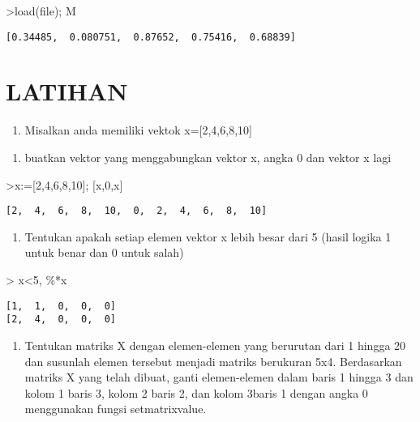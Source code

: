 \documentclass[
]{book}
\providecommand{\tightlist}{%
  \setlength{\itemsep}{0pt}\setlength{\parskip}{0pt}}
\begin{document}
\textgreater load(file); M

\begin{verbatim}
[0.34485,  0.080751,  0.87652,  0.75416,  0.68839]
\end{verbatim}

\section{LATIHAN}\label{latihan}

\begin{enumerate}
\def\labelenumi{\arabic{enumi}.}
\tightlist
\item
  Misalkan anda memiliki vektok x={[}2,4,6,8,10{]}
\end{enumerate}

\begin{enumerate}
\def\labelenumi{\alph{enumi}.}
\tightlist
\item
  buatkan vektor yang menggabungkan vektor x, angka 0 dan vektor x lagi
\end{enumerate}

\textgreater x:={[}2,4,6,8,10{]}; {[}x,0,x{]}

\begin{verbatim}
[2,  4,  6,  8,  10,  0,  2,  4,  6,  8,  10]
\end{verbatim}

\begin{enumerate}
\def\labelenumi{\alph{enumi}.}
\setcounter{enumi}{1}
\tightlist
\item
  Tentukan apakah setiap elemen vektor x lebih besar dari 5 (hasil logika 1 untuk benar dan 0 untuk salah)
\end{enumerate}

\textgreater{} x\textless5, \%*x

\begin{verbatim}
[1,  1,  0,  0,  0]
[2,  4,  0,  0,  0]
\end{verbatim}

\begin{enumerate}
\def\labelenumi{\arabic{enumi}.}
\setcounter{enumi}{1}
\tightlist
\item
  Tentukan matriks X dengan elemen-elemen yang berurutan dari 1 hingga 20 dan susunlah elemen tersebut menjadi matriks berukuran 5x4. Berdasarkan matriks X yang telah dibuat, ganti elemen-elemen dalam baris 1 hingga 3 dan kolom 1 baris 3, kolom 2 baris 2, dan kolom 3baris 1 dengan angka 0 menggunakan fungsi setmatrixvalue.
\end{enumerate}
\end{document}

